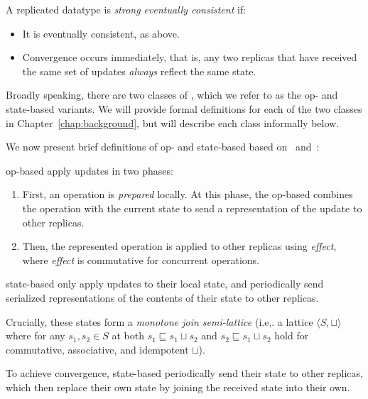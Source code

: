 \begin{definition}
  A replicated datatype is \emph{strong eventually consistent} if:
  \begin{itemize}
    \item It is eventually consistent, as above.
    \item Convergence occurs immediately, that is, any two replicas that have
      received the same set of updates \emph{always} reflect the same state.
  \end{itemize}
\end{definition}

Broadly speaking, there are two classes of \CRDTs, which we refer to as the op-
and state-based variants. We will provide formal definitions for each of the two
classes in Chapter~\ref{chap:background}, but will describe each class
informally below.

We now present brief definitions of op- and state-based \CRDTs based
on~\citet{baquero14} and~\citet{shapiro11}:

\begin{definition}
  op-based \CRDTs apply updates in two phases:
  \begin{enumerate}
    \item First, an operation is \emph{prepared} locally. At this phase, the
      op-based \CRDT combines the operation with the current state to send a
      representation of the update to other replicas.
    \item Then, the represented operation is applied to other replicas using
      \emph{effect}, where \emph{effect} is commutative for concurrent
      operations.
  \end{enumerate}
\end{definition}

\begin{definition}
  state-based \CRDTs only apply updates to their local state, and periodically
  send serialized representations of the contents of their state to other
  replicas.

  Crucially, these states form a \textit{monotone join semi-lattice} (i.e,. a
  lattice $\langle S, \sqcup \rangle$ where for any $s_1, s_2 \in S$ at both
  $s_1 \sqsubseteq s_1 \sqcup s_2$ and $s_2 \sqsubseteq s_1 \sqcup s_2$ hold for
  commutative, associative, and idempotent $\sqcup$).

  To achieve convergence, state-based \CRDTs periodically send their state to
  other replicas, which then replace their own state by joining the received
  state into their own.
\end{definition}

